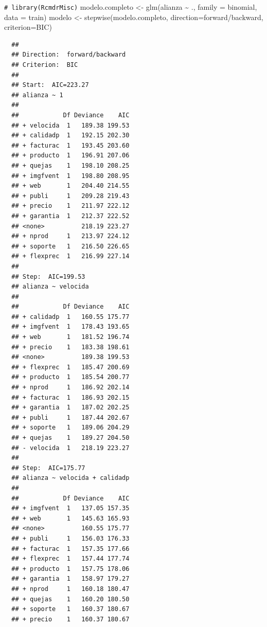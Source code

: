\documentclass[
]{book}
\newenvironment{Shaded}{\begin{snugshade}}{\end{snugshade}}
\newcommand{\AttributeTok}[1]{\textcolor[rgb]{0.77,0.63,0.00}{#1}}
\newcommand{\CommentTok}[1]{\textcolor[rgb]{0.56,0.35,0.01}{\textit{#1}}}
\newcommand{\FunctionTok}[1]{\textcolor[rgb]{0.00,0.00,0.00}{#1}}
\newcommand{\NormalTok}[1]{#1}
\newcommand{\OtherTok}[1]{\textcolor[rgb]{0.56,0.35,0.01}{#1}}
\newcommand{\SpecialCharTok}[1]{\textcolor[rgb]{0.00,0.00,0.00}{#1}}
\newcommand{\StringTok}[1]{\textcolor[rgb]{0.31,0.60,0.02}{#1}}
\theoremstyle{break}
\theoremstyle{nonumberplain}
\renewcommand{\CommentTok}[1]{\textcolor[rgb]{0.41,0.41,0.41}{\texttt{#1}}}
\begin{document}
\begin{Shaded}
\begin{Highlighting}[]
\CommentTok{\# library(RcmdrMisc)}
\NormalTok{modelo.completo }\OtherTok{\textless{}{-}} \FunctionTok{glm}\NormalTok{(alianza }\SpecialCharTok{\textasciitilde{}}\NormalTok{ ., }\AttributeTok{family =}\NormalTok{ binomial, }\AttributeTok{data =}\NormalTok{ train)}
\NormalTok{modelo }\OtherTok{\textless{}{-}} \FunctionTok{stepwise}\NormalTok{(modelo.completo, }\AttributeTok{direction=}\StringTok{\textquotesingle{}forward/backward\textquotesingle{}}\NormalTok{, }\AttributeTok{criterion=}\StringTok{\textquotesingle{}BIC\textquotesingle{}}\NormalTok{)}
\end{Highlighting}
\end{Shaded}

\begin{verbatim}
  ## 
  ## Direction:  forward/backward
  ## Criterion:  BIC 
  ## 
  ## Start:  AIC=223.27
  ## alianza ~ 1
  ## 
  ##            Df Deviance    AIC
  ## + velocida  1   189.38 199.53
  ## + calidadp  1   192.15 202.30
  ## + facturac  1   193.45 203.60
  ## + producto  1   196.91 207.06
  ## + quejas    1   198.10 208.25
  ## + imgfvent  1   198.80 208.95
  ## + web       1   204.40 214.55
  ## + publi     1   209.28 219.43
  ## + precio    1   211.97 222.12
  ## + garantia  1   212.37 222.52
  ## <none>          218.19 223.27
  ## + nprod     1   213.97 224.12
  ## + soporte   1   216.50 226.65
  ## + flexprec  1   216.99 227.14
  ## 
  ## Step:  AIC=199.53
  ## alianza ~ velocida
  ## 
  ##            Df Deviance    AIC
  ## + calidadp  1   160.55 175.77
  ## + imgfvent  1   178.43 193.65
  ## + web       1   181.52 196.74
  ## + precio    1   183.38 198.61
  ## <none>          189.38 199.53
  ## + flexprec  1   185.47 200.69
  ## + producto  1   185.54 200.77
  ## + nprod     1   186.92 202.14
  ## + facturac  1   186.93 202.15
  ## + garantia  1   187.02 202.25
  ## + publi     1   187.44 202.67
  ## + soporte   1   189.06 204.29
  ## + quejas    1   189.27 204.50
  ## - velocida  1   218.19 223.27
  ## 
  ## Step:  AIC=175.77
  ## alianza ~ velocida + calidadp
  ## 
  ##            Df Deviance    AIC
  ## + imgfvent  1   137.05 157.35
  ## + web       1   145.63 165.93
  ## <none>          160.55 175.77
  ## + publi     1   156.03 176.33
  ## + facturac  1   157.35 177.66
  ## + flexprec  1   157.44 177.74
  ## + producto  1   157.75 178.06
  ## + garantia  1   158.97 179.27
  ## + nprod     1   160.18 180.47
  ## + quejas    1   160.20 180.50
  ## + soporte   1   160.37 180.67
  ## + precio    1   160.37 180.67

\end{verbatim}
\end{document}
